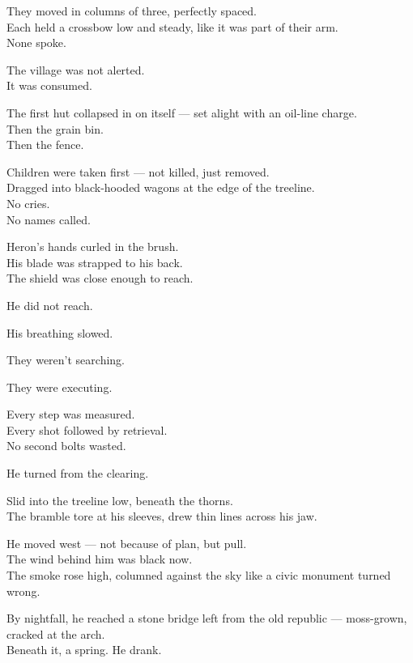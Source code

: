 \documentclass[9pt]{article}
\begin{document}
They moved in columns of three, perfectly spaced.\\
Each held a crossbow low and steady, like it was part of their arm.\\
None spoke.

\vspace{1em}

The village was not alerted.\\
It was consumed.

The first hut collapsed in on itself — set alight with an oil-line charge.\\
Then the grain bin.\\
Then the fence.

Children were taken first — not killed, just removed.\\
Dragged into black-hooded wagons at the edge of the treeline.\\
No cries.\\
No names called.

\vspace{1em}

Heron’s hands curled in the brush.\\
His blade was strapped to his back.\\
The shield was close enough to reach.

He did not reach.

His breathing slowed.

They weren’t searching.

They were executing.

Every step was measured.\\
Every shot followed by retrieval.\\
No second bolts wasted.

\vspace{1em}

He turned from the clearing.

Slid into the treeline low, beneath the thorns.\\
The bramble tore at his sleeves, drew thin lines across his jaw.

He moved west — not because of plan, but pull.\\
The wind behind him was black now.\\
The smoke rose high, columned against the sky like a civic monument turned wrong.

\vspace{1em}

By nightfall, he reached a stone bridge left from the old republic — moss-grown, cracked at the arch.\\
Beneath it, a spring.  
He drank.
\end{document}
